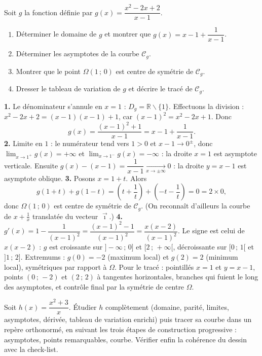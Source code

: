 \documentclass[11pt]{article}
\def\setminus{\mathbin{\backslash}}\let\smallsetminus\setminus
\begin{document}
\begin{exoresolu}
Soit $g$ la fonction définie par $g(x) = \dfrac{x^2 - 2x + 2}{x - 1}$.
\begin{enumerate}
\item Déterminer le domaine de $g$ et montrer que $g(x) = x - 1 + \dfrac{1}{x-1}$.
\item Déterminer les asymptotes de la courbe $\mathcal{C}_g$.
\item Montrer que le point $\Omega(1\,;\,0)$ est centre de symétrie de $\mathcal{C}_g$.
\item Dresser le tableau de variation de $g$ et décrire le tracé de $\mathcal{C}_g$.
\end{enumerate}
\tcblower
\textbf{1.} Le dénominateur s'annule en $x = 1$ : $D_g = \mathbb{R} \setminus \{1\}$. Effectuons la division : $x^2 - 2x + 2 = (x-1)(x-1) + 1$, car $(x-1)^2 = x^2 - 2x + 1$. Donc
\[ g(x) = \frac{(x-1)^2 + 1}{x-1} = x - 1 + \frac{1}{x-1}. \]
\textbf{2.} Limite en $1$ : le numérateur tend vers $1 > 0$ et $x - 1 \to 0^\pm$, donc $\lim_{x \to 1^+} g(x) = +\infty$ et $\lim_{x \to 1^-} g(x) = -\infty$ : la droite $x = 1$ est asymptote verticale. Ensuite $g(x) - (x-1) = \dfrac{1}{x-1} \xrightarrow[x \to \pm\infty]{} 0$ : la droite $y = x - 1$ est asymptote oblique.
\textbf{3.} Posons $x = 1 + t$. Alors
\[ g(1+t) + g(1-t) = \left(t + \frac{1}{t}\right) + \left(-t - \frac{1}{t}\right) = 0 = 2 \times 0, \]
donc $\Omega(1\,;\,0)$ est centre de symétrie de $\mathcal{C}_g$. (On reconnaît d'ailleurs la courbe de $x + \tfrac{1}{x}$ translatée du vecteur $\vec{\imath}$.)
\textbf{4.} $g'(x) = 1 - \dfrac{1}{(x-1)^2} = \dfrac{(x-1)^2 - 1}{(x-1)^2} = \dfrac{x(x-2)}{(x-1)^2}$. Le signe est celui de $x(x-2)$ : $g$ est croissante sur $]-\infty\,;\,0]$ et $[2\,;\,+\infty[$, décroissante sur $[0\,;\,1[$ et $]1\,;\,2]$. Extremums : $g(0) = -2$ (maximum local) et $g(2) = 2$ (minimum local), symétriques par rapport à $\Omega$. Pour le tracé : pointillés $x = 1$ et $y = x-1$, points $(0\,;\,-2)$ et $(2\,;\,2)$ à tangentes horizontales, branches qui fuient le long des asymptotes, et contrôle final par la symétrie de centre $\Omega$.
\end{exoresolu}

\begin{exercice}
Soit $h(x) = \dfrac{x^2 + 3}{x}$. Étudier $h$ complètement (domaine, parité, limites, asymptotes, dérivée, tableau de variation enrichi) puis tracer sa courbe dans un repère orthonormé, en suivant les trois étapes de construction progressive : asymptotes, points remarquables, courbe. Vérifier enfin la cohérence du dessin avec la check-list.
\end{exercice}
\end{document}
